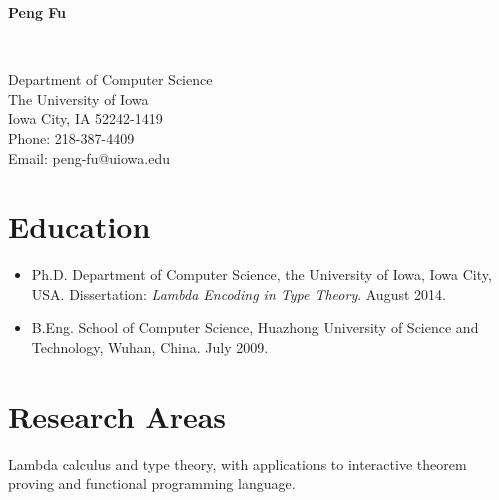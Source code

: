 \documentclass[11pt]{article}
\begin{document}
\begin{center}
{\Large{\bfseries Peng Fu}}

\

Department of Computer Science\\
The University of Iowa\\
Iowa City, IA 52242-1419\\
Phone: 218-387-4409\\
Email: peng-fu@uiowa.edu\\

\end{center}



\section*{Education}

\begin{itemize}
\item Ph.D. Department of Computer Science, the University of Iowa, Iowa City, USA. 
  Dissertation: \textit{Lambda Encoding in Type Theory}. August 2014. %
  \item B.Eng. School of Computer Science, Huazhong University of Science and Technology, Wuhan, China. July 2009. %
\end{itemize}
\section*{Research Areas}
Lambda calculus and type theory, with applications to interactive theorem proving and functional programming language.
\end{document}
